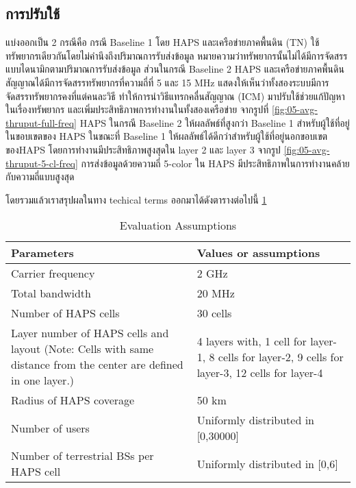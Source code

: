 \pagebreak

\subsection{การปรับใช้}

แบ่งออกเป็น 2 กรณีคือ กรณี Baseline 1 โดย HAPS และเครือข่ายภาคพื้นดิน (TN) ใช้ทรัพยากรเดียวกันโดยไม่คำนึงถึงปริมาณการรับส่งข้อมูล 
หมายความว่าทรัพยากรนั้นไม่ได้มีการจัดสรรแบบไดนามิกตามปริมาณการรับส่งข้อมูล ส่วนในกรณี Baseline 2 HAPS และเครือข่ายภาคพื้นดินสัญญาณได้มีการจัดสรรทรัพยากรที่ความถี่ที่ 5 และ 15 MHz 
แสดงให้เห็นว่าทั้งสองระบบมีการจัดสรรทรัพยากรคงที่แต่คนละวิธี ทำให้การนำวิธีแทรกคลื่นสัญญาณ (ICM) มาปรับใช้ช่วยแก้ปัญหาในเรื่องทรัพยากร
และเพิ่มประสิทธิภาพการทำงานในทั้งสองเครือข่าย จากรูปที่ \ref{fig:05-avg-thruput-full-freq} HAPS ในกรณี Baseline 2 ให้ผลลัพธ์ที่สูงกว่า Baseline 1 
สำหรับผู้ใช้ที่อยู่ในขอบเขตของ HAPS ในขณะที่ Baseline 1 ให้ผลลัพธ์ได้ดีกว่าสำหรับผู้ใช้ที่อยู่นอกขอบเขตของHAPS โดยการทำงานมีประสิทธิภาพสูงสุดใน layer 2
และ layer 3 จากรูป \ref{fig:05-avg-thruput-5-cl-freq} การส่งข้อมูลด้วยความถี่ 5-color ใน HAPS มีประสิทธิภาพในการทำงานคล้ายกับความถี่แบบสูงสุด

โดยรวมแล้วเราสรุปผลในทาง techical terms ออกมาได้ดังตารางต่อไปนี้ \ref{table:04-haps-evaluation}

\begin{table}[h]
\centering
\begin{tabular}[h]{| l | l |}
\hline
Parameters                      & Values or assumptions \\
\hline
Carrier frequency               & 2 GHz \\
\hline
Total bandwidth                 & 20 MHz \\
\hline
Number of HAPS cells            & 30 cells \\
\hline
\parbox[t]{12em}{Layer number of HAPS cells and layout (Note: Cells with same distance from the center are defined in one layer.)}        & \parbox[t]{12em}{4 layers with, 1 cell for layer-1, 8 cells for layer-2, 9 cells for layer-3, 12 cells for layer-4} \\
\hline
Radius of HAPS coverage         & 50 km \\
\hline
Number of users                 & Uniformly distributed in [0,30000] \\
\hline
Number of terrestrial BSs per HAPS cell & Uniformly distributed in [0,6]\\
\hline
\end{tabular}
\caption{Evaluation Assumptions} \label{table:04-haps-evaluation}
\end{table}

